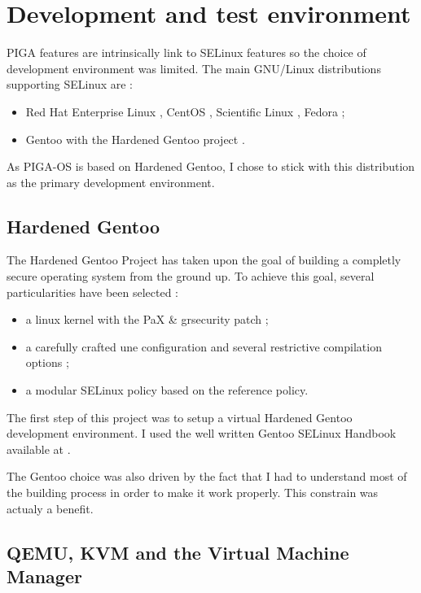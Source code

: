 \documentclass[pdftex,a4paper,titlepage,11pt]{article}
\begin{document}
\newpage

\section{Development and test environment}

PIGA features are intrinsically link to SELinux features so the choice of development environment was limited. The main GNU/Linux distributions supporting SELinux are :

\begin{itemize}
	\item Red Hat Enterprise Linux \cite{RHEL}, CentOS \cite{CENTOS}, Scientific Linux \cite{SL}, Fedora \cite{FEDORA} ;
	\item Gentoo \cite{GENTOO} with the Hardened Gentoo project \cite{GENTOOH}.
\end{itemize}

\smallskip

As PIGA-OS is based on Hardened Gentoo, I chose to stick with this distribution as the primary development environment.

\subsection{Hardened Gentoo}

The Hardened Gentoo Project has taken upon the goal of building a completly secure operating system from the ground up. To achieve this goal, several particularities have been selected :
\begin{itemize}
	\item a linux kernel with the PaX \& grsecurity patch ;
	\item a carefully crafted une configuration and several restrictive compilation options ;
	\item a modular SELinux policy based on the reference policy.
\end{itemize}

\smallskip

The first step of this project was to setup a virtual Hardened Gentoo development environment. I used the well written Gentoo SELinux Handbook available at \cite{GSELH}.

\bigskip

The Gentoo choice was also driven by the fact that I had to understand most of the building process in order to make it work properly. This constrain was actualy a benefit.

\subsection{QEMU, KVM and the Virtual Machine Manager}
\end{document}
